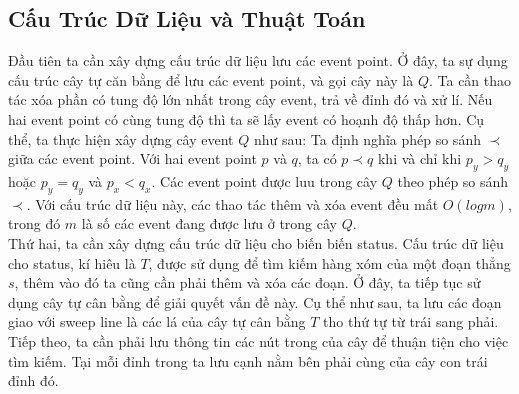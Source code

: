\documentclass[15pt]{article}
\begin{document}
{\subsection{Cấu Trúc Dữ Liệu và Thuật Toán}
Đầu tiên ta cần xây dựng cấu trúc dữ liệu lưu các event point. Ở đây, ta sự dụng cấu trúc cây tự căn bằng để lưu các event point, và gọi cây này là $Q$. Ta cần thao tác xóa phần có tung độ lớn nhất trong cây event, trả về đỉnh đó và xử lí. Nếu hai event point có cùng tung độ thì ta sẽ lấy event có hoạnh độ thấp hơn. Cụ thể, ta thực hiện xây dựng cây event $Q$ như sau:  Ta định nghĩa phép so sánh $\prec$ giữa các event point. Với hai event point $p$ và $q$, ta có $p \prec q$ khi và chỉ khi $p_y > q_y$ hoặc $p_y = q_y$ và $p_x < q_x$. Các event point được luu trong cây $Q$ theo phép so sánh $\prec$. Với cấu trúc dữ liệu này, các thao tác thêm và xóa event đều mất $O(log m)$, trong đó $m$ là số các event đang được lưu ở trong cây $Q$. \\

Thứ hai, ta cần xây dựng cấu trúc dữ liệu cho biến biến status. Cấu trúc dữ liệu cho status, kí hiêu là $T$, được sử dụng để tìm kiếm hàng xóm của một đoạn thẳng $s$, thêm vào đó ta cũng cần phải thêm và xóa các đoạn. Ở đây, ta tiếp tục sử dụng cây tự cân bằng để giải quyết vấn đề này. Cụ thể như sau, ta lưu các đoạn giao với sweep line là các lá của cây tự cân bằng $T$ tho thứ tự từ trái sang phải. Tiếp theo, ta cần phải lưu thông tin các nút trong của cây để thuận tiện cho việc tìm kiếm. Tại mỗi đỉnh trong ta lưu cạnh nằm bên phải cùng của cây con trái đỉnh đó.\\

}
\end{document}
